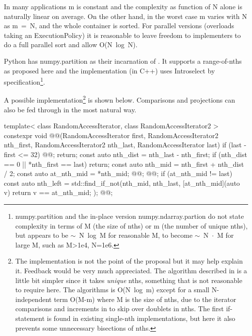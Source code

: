 In many applications m is constant and the complexity as function of N alone is naturally linear on average. On the other hand, in the worst case m varies with N as \mbox{m = N}, and the whole container is sorted. For parallel versions (overloads taking an ExecutionPolicy) it is reasonable to leave freedom to implementers to do a full parallel sort and allow \mbox{O(N log N)}.

Python has numpy.partition\cite{NpPart} as their incarnation of .
It supports a range-of-nths as proposed here and the implementation\cite{NPImpl} (in C++) uses \mbox{Introselect\cite{Musser1997}} by specification\footnote{numpy.partition and the in-place version numpy.ndarray.partion do not state complexity in terms of M (the size of nths) or m (the number of unique nths), but appears to be \mbox{$\sim$ N log M} for reasonable M, to become \mbox{$\sim$ N $\cdot$ M} for large M, such as M>1e4, N=1e6. }.

A possible implementation\footnote{
The implementation is not the point of the proposal but it may help explain it. Feedback would be very much appreciated. 
The algorithm described in \cite{Alsuwaiyel2001} is a little bit simpler since it takes \emph{unique} nths, something that is not reasonable to require here. The algorithms is \mbox{O(N log m)} except for a small N-independent term \mbox{O(M-m)} where M is the size of nths, due to the iterator comparisons and increments in  to skip over doublets in nths. The first if-statement is found in existing single-nth  implementations, but here it also prevents some unnecessary bisections of nths.}\cite{p2375RefImpl}
is shown below. Comparisons and projections can also be fed through in the most natural way. 

\begin{codeblock}
template< class RandomAccessIterator, class RandomAccessIterator2 >
constexpr void @@(RandomAccessIterator first, 
  RandomAccessIterator2 nth_first, RandomAccessIterator2 nth_last, 
  RandomAccessIterator last)
{
  if (last - first <= 32) { @@; return; }
  const auto nth_dist = nth_last - nth_first;
  if (nth_dist == 0 || *nth_first == last) return;
  const auto nth_mid = nth_first + nth_dist / 2;
  const auto at_nth_mid = *nth_mid;
  @@;
  @@;
  if (at_nth_mid != last){
    const auto nth_left = std::find_if_not(nth_mid, nth_last, 
      [at_nth_mid](auto v) {return v == at_nth_mid; });
    @@;
  }
}

\end{codeblock}

